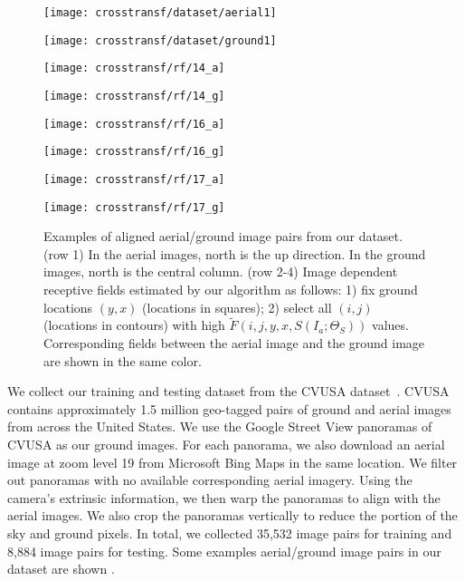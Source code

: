 \begin{figure}
	\newlength{\aheight}
	\setlength{\aheight}{1.75cm}
	\newlength{\gwidth}
	\setlength{\gwidth}{.76\linewidth}
	\newlength{\gspace}
	\setlength{\gspace}{.4cm}
	\centering
	\texttt{[image: crosstransf/dataset/aerial1]}\hspace{6pt}%
	\begin{minipage}[b]{\gwidth}
	\texttt{[image: crosstransf/dataset/ground1]}\vfill
	\end{minipage}\vspace{1pt}
	\texttt{[image: crosstransf/rf/14\_a]}\hspace{6pt}%
	\begin{minipage}[b]{\gwidth}
	\texttt{[image: crosstransf/rf/14\_g]}\vfill
	\end{minipage}\vspace{1pt}
	\texttt{[image: crosstransf/rf/16\_a]}\hspace{6pt}%
	\begin{minipage}[b]{\gwidth}
	\texttt{[image: crosstransf/rf/16\_g]}\vfill
	\end{minipage}\vspace{1pt}
	\texttt{[image: crosstransf/rf/17\_a]}\hspace{6pt}%
	\begin{minipage}[b]{\gwidth}
	\texttt{[image: crosstransf/rf/17\_g]}\vfill
	\end{minipage}\vspace{1pt}

  \caption{Examples of aligned aerial/ground image pairs from our
dataset. (row 1) In the aerial images, north is the up direction.  In
the ground images, north is the central column. (row 2-4) Image
dependent receptive fields estimated by our algorithm as follows: 1)
fix ground locations $(y, x)$ (locations in squares); 2) select all
$(i, j)$ (locations in contours) with high $\tilde{F}(i,j,y,x,
S(I_a; \Theta_S))$ values.  Corresponding fields between the aerial image and
the ground image are shown in the same color.}

  \label{fig:dataset_cross}
\end{figure}

We collect our training and testing dataset from the CVUSA
dataset~\cite{workman2015wide}. CVUSA contains approximately 1.5 million
geo-tagged pairs of ground and aerial images from across the
United States. We use the Google Street View panoramas of CVUSA as our
ground images. For each panorama, we also
download an aerial image at zoom level 19 from Microsoft Bing Maps 
in the same location. We filter out panoramas with no available 
corresponding aerial imagery. Using the camera's extrinsic
information, we then warp the panoramas to align with the
aerial images.  We also crop the panoramas vertically 
to reduce the portion of the sky and
ground pixels.  In total, we collected 35,532 image pairs for
training and 8,884 image pairs for testing. Some examples aerial/ground 
image pairs in our dataset are shown . 

